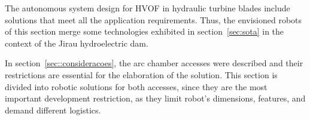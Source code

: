 The autonomous system design for HVOF in hydraulic turbine blades include
solutions that meet all the application requirements. Thus, the envisioned
robots of this section merge some technologies exhibited in
section~\ref{sec:sota} in the context of the Jirau hydroelectric dam.


In section~\ref{sec::consideracoes}, the arc chamber accesses were described
and their restrictions are essential for the elaboration of the solution.
This section is divided into robotic solutions for both accesses, since they
are the most important development restriction, as they limit robot's
dimensions, features, and demand different logistics.

